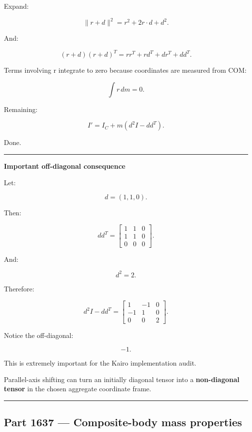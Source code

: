 Expand:

\[
\|r+d\|^2
=
r^2+2r\cdot d+d^2.
\]

And:

\[
(r+d)(r+d)^T
=
rr^T+rd^T+dr^T+dd^T.
\]

Terms involving r integrate to zero because coordinates are measured from COM:

\[
\int r\,dm=0.
\]

Remaining:

\[
I'
=
I_C+
m(d^2I-dd^T).
\]

Done.

\begin{center}\rule{0.5\linewidth}{0.5pt}\end{center}

\textbf{Important off-diagonal consequence}

Let:

\[
d=(1,1,0).
\]

Then:

\[
dd^T
=
\begin{bmatrix}
1&1&0\\
1&1&0\\
0&0&0
\end{bmatrix}.
\]

And:

\[
d^2=2.
\]

Therefore:

\[
d^2I-dd^T
=
\begin{bmatrix}
1&-1&0\\
-1&1&0\\
0&0&2
\end{bmatrix}.
\]

Notice the off-diagonal:

\[
-1.
\]

This is extremely important for the Kairo implementation audit.

Parallel-axis shifting can turn an initially diagonal tensor into a \textbf{non-diagonal tensor} in the chosen aggregate coordinate frame.

\begin{center}\rule{0.5\linewidth}{0.5pt}\end{center}

\subsection{Part 1637 --- Composite-body mass properties}\label{06-engine-ii-ch035-part-1637-composite-body-mass-properties}

